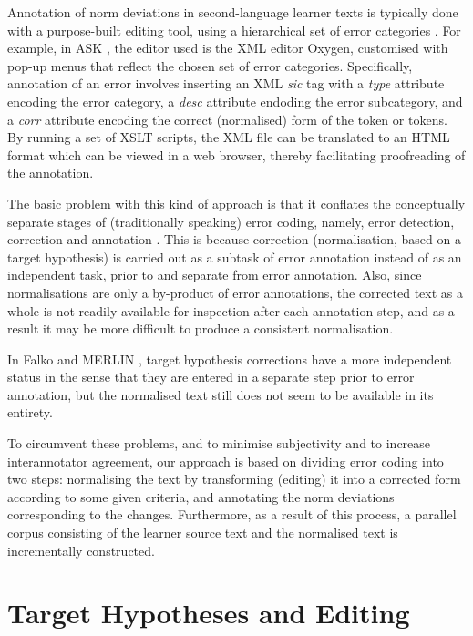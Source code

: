 \documentclass[10pt, a4paper]{article}
\begin{document}
Annotation of norm deviations in second-language learner texts is typically done with a purpose-built editing tool, using a hierarchical set of error categories \cite{Granger2008}. For example, in ASK \cite{tenfjord2006ask}, the editor used is the XML editor Oxygen, customised with pop-up menus that reflect the chosen set of error categories. Specifically, annotation of an error involves inserting an XML
{\em sic} tag with a {\em type} attribute encoding the error category, a {\em desc} attribute endoding the error subcategory, and a {\em corr} attribute encoding the correct (normalised) form of the token or tokens. By running a set of XSLT scripts, the XML file can be translated to an HTML format which can be viewed in a web browser, thereby facilitating proofreading of the annotation.

The basic problem with this kind of approach is that it conflates the conceptually separate stages of (traditionally speaking) error coding, namely, error detection, correction and annotation
\cite[page 266]{Ellis1994,Granger2008}. This is because correction (normalisation, based on a target hypothesis) is carried out as a subtask of error annotation instead of as an independent task, prior to and separate from error annotation. Also, since normalisations are only a by-product of error annotations, the corrected text as a whole is not readily available for inspection after each annotation step, and as a result it may be more difficult to produce a consistent normalisation.

In Falko \cite{ludeling05multi-levelerror} and MERLIN \cite{MERLIN2014}, target hypothesis corrections have a more independent status in the sense that they are entered in a separate step prior to error annotation, but the normalised text still does not seem to be available in its entirety.

To circumvent these problems, and to minimise subjectivity and to increase interannotator agreement, our approach is based on dividing error coding into two steps: normalising the text by transforming (editing) it into a corrected form according to some given criteria, and annotating the norm deviations corresponding to the changes. Furthermore, as a result of this process, a parallel corpus consisting of the learner source text and the normalised text is incrementally constructed.

\section{Target Hypotheses and Editing}
\label{sec:targethypothesis}
\end{document}
